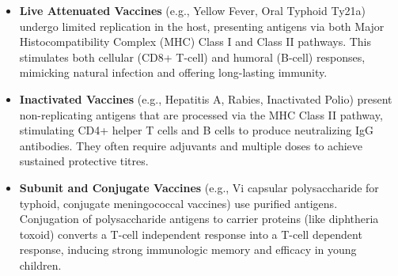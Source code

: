 \begin{itemize}
    \item \textbf{Live Attenuated Vaccines} (e.g., Yellow Fever, Oral Typhoid Ty21a) undergo limited replication in the host, presenting antigens via both Major Histocompatibility Complex (MHC) Class I and Class II pathways. This stimulates both cellular (CD8+ T-cell) and humoral (B-cell) responses, mimicking natural infection and offering long-lasting immunity.
    \item \textbf{Inactivated Vaccines} (e.g., Hepatitis A, Rabies, Inactivated Polio) present non-replicating antigens that are processed via the MHC Class II pathway, stimulating CD4+ helper T cells and B cells to produce neutralizing IgG antibodies. They often require adjuvants and multiple doses to achieve sustained protective titres.
    \item \textbf{Subunit and Conjugate Vaccines} (e.g., Vi capsular polysaccharide for typhoid, conjugate meningococcal vaccines) use purified antigens. Conjugation of polysaccharide antigens to carrier proteins (like diphtheria toxoid) converts a T-cell independent response into a T-cell dependent response, inducing strong immunologic memory and efficacy in young children.
\end{itemize}

